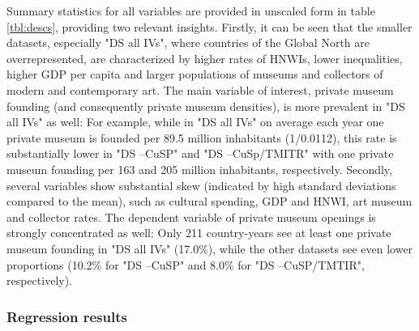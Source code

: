 \documentclass[11pt, authoryear]{elsarticle}
\begin{document}
Summary statistics for all variables are provided in unscaled form in table \ref{tbl:descs}, providing two relevant insights. 
Firstly, it can be seen that the smaller datasets, especially "DS all IVs", where countries of the Global North are overrepresented, are characterized by higher rates of HNWIs, lower inequalities, higher GDP per capita and larger populations of museums and collectors of modern and contemporary art.
The main variable of interest, private museum founding (and consequently private museum densities), is more prevalent in "DS all IVs" as well: 
For example, while in "DS all IVs" on average each year one private museum is founded per 89.5 million inhabitants (1/0.0112), this rate is substantially lower in "DS --CuSP" and "DS --CuSp/TMITR" with one private museum founding per 163 and 205 million inhabitants, respectively.
Secondly, several variables show substantial skew (indicated by high standard deviations compared to the mean), such as cultural spending, GDP and HNWI, art museum and collector rates. 
The dependent variable of private museum openings is strongly concentrated as well: 
Only 211 country-years see at least one private museum founding in "DS all IVs" (17.0\%), while the other datasets see even lower proportions (10.2\% for "DS --CuSP" and 8.0\% for "DS --CuSP/TMTIR", respectively).




\FloatBarrier

\subsubsection*{Regression results}
\end{document}
